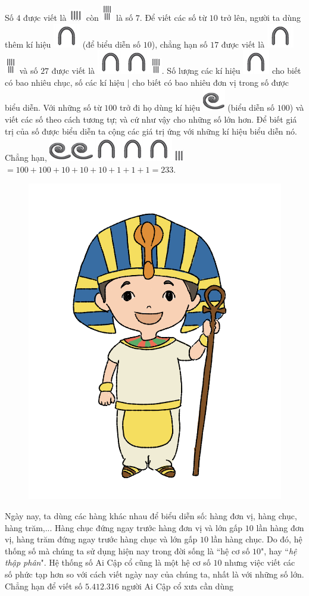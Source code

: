 	Số $4$ được viết là \includegraphics{3} còn \includegraphics{4}  là số $7$. Để viết các số từ $10$ trở lên, người ta dùng thêm kí hiệu \includegraphics{5} (để biểu diễn số $10$), chẳng hạn số $17$ được viết là \includegraphics{5}\includegraphics{4} và số $27$ được viết là  \includegraphics{5}\includegraphics{5}\includegraphics{4}. Số lượng các kí hiệu \includegraphics{5} cho biết có bao nhiêu chục, số các kí hiệu $\mid$ cho biết có bao nhiêu đơn vị trong số được biểu diễn. Với những số từ $100$ trở đi họ dùng kí hiệu \includegraphics{6} (biểu diễn số $100$) và viết các số theo cách tương tự; và cứ như vậy cho những số lớn hơn. Để biết giá trị của số được biểu diễn ta cộng các giá trị ứng với những kí hiệu biểu diễn nó. Chẳng hạn, \includegraphics{6}\includegraphics{6}\includegraphics{5}\includegraphics{5}\includegraphics{5}\includegraphics{3.1}   $=  100+ 100 + 10 + 10 + 10 + 1 + 1 + 1= 233$.
	\vskip 0.1cm
		\begin{figure}
		\centering
		\vspace*{-15pt}
		\captionsetup{labelformat= empty, justification=centering}
		\includegraphics[width=1\linewidth]{20.12-pi.1}
		\vspace*{-25pt}
	\end{figure}
	Ngày nay, ta dùng các hàng khác nhau để biểu diễn số: hàng đơn vị, hàng chục, hàng trăm,... Hàng chục đứng ngay trước hàng đơn vị và lớn gấp $10$ lần hàng đơn vị, hàng trăm đứng ngay trước hàng chục và lớn gấp $10$ lần hàng chục. Do đó, hệ thống số mà chúng ta sử dụng hiện nay trong đời sống là ``hệ cơ số $10$",  hay ``\textit{hệ thập phân}". Hệ thống số Ai Cập cổ cũng là một hệ cơ số $10$ nhưng việc viết các số phức tạp hơn so với cách viết ngày nay của chúng ta, nhất là với những số lớn. Chẳng hạn để viết số ${5.}412{.}316$ người Ai Cập cổ xưa cần dùng 